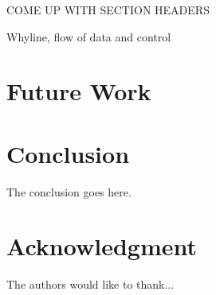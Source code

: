 \documentclass[conference]{IEEEtran}
\begin{document}
COME UP WITH SECTION HEADERS

Whyline, flow of data and control

\section{Future Work}
\label{sec:fw}

\section{Conclusion}
\label{sec:concl}
The conclusion goes here.






\section*{Acknowledgment}


The authors would like to thank...




%




\end{document}
